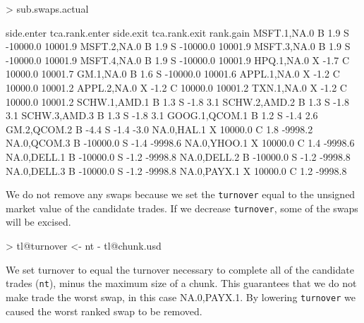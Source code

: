 \documentclass{article}
\begin{document}
\begin{Schunk}
\begin{Sinput}
> sub.swaps.actual
\end{Sinput}
\begin{Soutput}
              side.enter tca.rank.enter side.exit tca.rank.exit rank.gain
MSFT.1,NA.0            B            1.9         S      -10000.0   10001.9
MSFT.2,NA.0            B            1.9         S      -10000.0   10001.9
MSFT.3,NA.0            B            1.9         S      -10000.0   10001.9
MSFT.4,NA.0            B            1.9         S      -10000.0   10001.9
HPQ.1,NA.0             X           -1.7         C       10000.0   10001.7
GM.1,NA.0              B            1.6         S      -10000.0   10001.6
APPL.1,NA.0            X           -1.2         C       10000.0   10001.2
APPL.2,NA.0            X           -1.2         C       10000.0   10001.2
TXN.1,NA.0             X           -1.2         C       10000.0   10001.2
SCHW.1,AMD.1           B            1.3         S          -1.8       3.1
SCHW.2,AMD.2           B            1.3         S          -1.8       3.1
SCHW.3,AMD.3           B            1.3         S          -1.8       3.1
GOOG.1,QCOM.1          B            1.2         S          -1.4       2.6
GM.2,QCOM.2            B           -4.4         S          -1.4      -3.0
NA.0,HAL.1             X        10000.0         C           1.8   -9998.2
NA.0,QCOM.3            B       -10000.0         S          -1.4   -9998.6
NA.0,YHOO.1            X        10000.0         C           1.4   -9998.6
NA.0,DELL.1            B       -10000.0         S          -1.2   -9998.8
NA.0,DELL.2            B       -10000.0         S          -1.2   -9998.8
NA.0,DELL.3            B       -10000.0         S          -1.2   -9998.8
NA.0,PAYX.1            X        10000.0         C           1.2   -9998.8
\end{Soutput}
\end{Schunk}

We do not remove any swaps because we set the \texttt{turnover} equal
to the unsigned market value of the candidate trades.  If we
decrease \texttt{turnover}, some of the swaps will be excised.


\begin{Schunk}
\begin{Sinput}
> tl@turnover <- nt - tl@chunk.usd
\end{Sinput}
\end{Schunk}

We set turnover to equal the turnover necessary to complete all of the
candidate trades (\texttt{nt}), minus the maximum size of a chunk.
This guarantees that we do not make trade the worst swap, in this case
NA.0,PAYX.1.  By lowering
\texttt{turnover} we caused the worst ranked swap to be removed.
\end{document}

